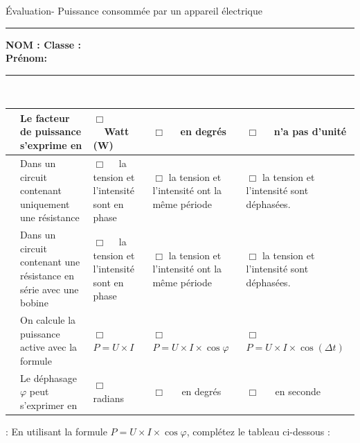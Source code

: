 \documentclass[11pt,a4paper]{article}
\begin{document}
\noindent

\begin{center}
\LARGE{Évaluation- Puissance consommée par un appareil électrique}\\[8mm]
\end{center}
\normalsize
\hrule 


\flushleft \textbf{NOM : \hfill Classe : \hspace{3cm} ~~\\[2mm]
Prénom:\\[0,4cm]
}
\hrule\
\\[0,2cm]

\vspace {8 mm}




    \begin{tabular}{p{2mm} p{5.5cm}|C{3cm}|C{3cm}|C{3cm}}
    

         & Le facteur de puissance s'exprime en & $\Box $ ~~Watt  (W) & $\Box $ ~~en degrés    & $\Box $ ~~n'a pas d'unité  \\
         \hline
       & Dans un circuit contenant uniquement une résistance & $\Box $ ~~la tension et l'intensité sont en phase & $\Box $ la tension et l'intensité ont la même période & $\Box $ la tension et l'intensité sont déphasées. \\
        \hline
          & Dans un circuit contenant une résistance en série avec une bobine& $\Box $ ~~la tension et l'intensité sont en phase & $\Box $ la tension et l'intensité ont la même période & $\Box $ la tension et l'intensité sont déphasées. \\
         \hline
          & On calcule la puissance active avec la formule   &$\Box $ $P=U \times I$ &$\Box $ ~~ $P=U \times I \times \cos \varphi$  & $\Box $ $P=U \times I \times \cos (\Delta t)$\\

         \hline
         
         & Le déphasage $\varphi$ peut s'exprimer en &$\Box $ ~~ radians &$\Box $ ~~ en degrés  & $\Box $ ~~ en seconde  \\

 
        
         \end{tabular}
\vfill  

 : En utilisant la formule $P=U \times I \times \cos \varphi$, complétez le tableau ci-dessous :
\end{document}

